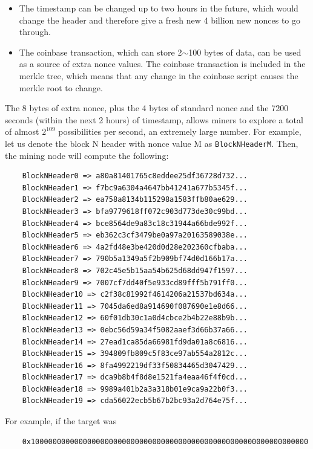 \documentclass{article}
\begin{document}
    \begin{itemize}
      \item The timestamp can be changed up to two hours in the future, which would change the header and therefore give a fresh new 4 billion new nonces to go through.
      \item The coinbase transaction, which can store 2$\sim$100 bytes of data, can be used as a source of extra nonce values. The coinbase transaction is included in the merkle tree, which means that any change in the coinbase script causes the merkle root to change.
    \end{itemize}

    The 8 bytes of extra nonce, plus the 4 bytes of standard nonce and the 7200 seconds (within the next 2 hours) of timestamp, allows miners to explore a total of almost $2^{109}$ possibilities per second, an extremely large number. For example, let us denote the block N header with nonce value M as \texttt{BlockNHeaderM}. Then, the mining node will compute the following:

    \begin{lstlisting}
    BlockNHeader0 => a80a81401765c8eddee25df36728d732...
    BlockNHeader1 => f7bc9a6304a4647bb41241a677b5345f...
    BlockNHeader2 => ea758a8134b115298a1583ffb80ae629...
    BlockNHeader3 => bfa9779618ff072c903d773de30c99bd...
    BlockNHeader4 => bce8564de9a83c18c31944a66bde992f...
    BlockNHeader5 => eb362c3cf3479be0a97a20163589038e...
    BlockNHeader6 => 4a2fd48e3be420d0d28e202360cfbaba...
    BlockNHeader7 => 790b5a1349a5f2b909bf74d0d166b17a...
    BlockNHeader8 => 702c45e5b15aa54b625d68dd947f1597...
    BlockNHeader9 => 7007cf7dd40f5e933cd89fff5b791ff0...
    BlockNHeader10 => c2f38c81992f4614206a21537bd634a...
    BlockNHeader11 => 7045da6ed8a914690f087690e1e8d66...
    BlockNHeader12 => 60f01db30c1a0d4cbce2b4b22e88b9b...
    BlockNHeader13 => 0ebc56d59a34f5082aaef3d66b37a66...
    BlockNHeader14 => 27ead1ca85da66981fd9da01a8c6816...
    BlockNHeader15 => 394809fb809c5f83ce97ab554a2812c...
    BlockNHeader16 => 8fa4992219df33f50834465d3047429...
    BlockNHeader17 => dca9b8b4f8d8e1521fa4eaa46f4f0cd...
    BlockNHeader18 => 9989a401b2a3a318b01e9ca9a22b0f3...
    BlockNHeader19 => cda56022ecb5b67b2bc93a2d764e75f...
    \end{lstlisting}

    For example, if the target was

    \begin{lstlisting}
    0x1000000000000000000000000000000000000000000000000000000000000000
    \end{lstlisting}
\end{document}
